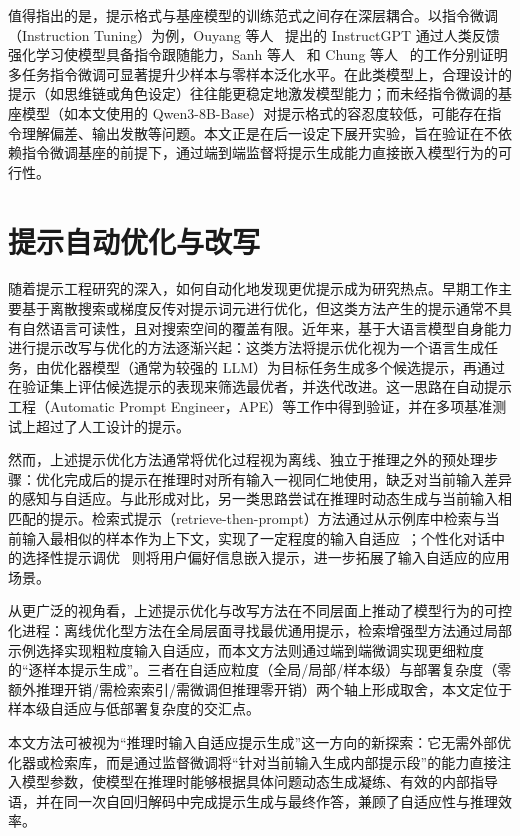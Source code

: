值得指出的是，提示格式与基座模型的训练范式之间存在深层耦合。以指令微调（Instruction Tuning）为例，Ouyang 等人~\cite{instructgpt} 提出的 InstructGPT 通过人类反馈强化学习使模型具备指令跟随能力，Sanh 等人~\cite{sanh2022multitask} 和 Chung 等人~\cite{chung2024scaling} 的工作分别证明多任务指令微调可显著提升少样本与零样本泛化水平。在此类模型上，合理设计的提示（如思维链或角色设定）往往能更稳定地激发模型能力；而未经指令微调的基座模型（如本文使用的 Qwen3-8B-Base）对提示格式的容忍度较低，可能存在指令理解偏差、输出发散等问题。本文正是在后一设定下展开实验，旨在验证在不依赖指令微调基座的前提下，通过端到端监督将提示生成能力直接嵌入模型行为的可行性。

\section{提示自动优化与改写}
\label{section:prompt-rewrite}

随着提示工程研究的深入，如何自动化地发现更优提示成为研究热点。早期工作主要基于离散搜索或梯度反传对提示词元进行优化，但这类方法产生的提示通常不具有自然语言可读性，且对搜索空间的覆盖有限。近年来，基于大语言模型自身能力进行提示改写与优化的方法逐渐兴起：这类方法将提示优化视为一个语言生成任务，由优化器模型（通常为较强的 LLM）为目标任务生成多个候选提示，再通过在验证集上评估候选提示的表现来筛选最优者，并迭代改进。这一思路在自动提示工程（Automatic Prompt Engineer，APE）等工作中得到验证，并在多项基准测试上超过了人工设计的提示。

然而，上述提示优化方法通常将优化过程视为离线、独立于推理之外的预处理步骤：优化完成后的提示在推理时对所有输入一视同仁地使用，缺乏对当前输入差异的感知与自适应。与此形成对比，另一类思路尝试在推理时动态生成与当前输入相匹配的提示。检索式提示（retrieve-then-prompt）方法通过从示例库中检索与当前输入最相似的样本作为上下文，实现了一定程度的输入自适应~\cite{lewis2020retrieval}；个性化对话中的选择性提示调优~\cite{huang-etal-2024-selective} 则将用户偏好信息嵌入提示，进一步拓展了输入自适应的应用场景。

从更广泛的视角看，上述提示优化与改写方法在不同层面上推动了模型行为的可控化进程：离线优化型方法在全局层面寻找最优通用提示，检索增强型方法通过局部示例选择实现粗粒度输入自适应，而本文方法则通过端到端微调实现更细粒度的“逐样本提示生成”。三者在自适应粒度（全局/局部/样本级）与部署复杂度（零额外推理开销/需检索索引/需微调但推理零开销）两个轴上形成取舍，本文定位于样本级自适应与低部署复杂度的交汇点。

本文方法可被视为“推理时输入自适应提示生成”这一方向的新探索：它无需外部优化器或检索库，而是通过监督微调将“针对当前输入生成内部提示段”的能力直接注入模型参数，使模型在推理时能够根据具体问题动态生成凝练、有效的内部指导语，并在同一次自回归解码中完成提示生成与最终作答，兼顾了自适应性与推理效率。

